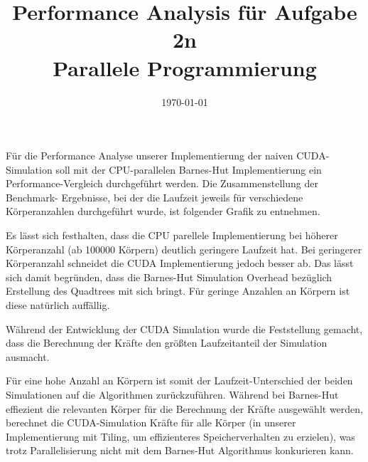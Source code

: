 \documentclass[
  ngerman,
  color=8c,
  submission,
  boxarc,
  fleqn,
]{rubos-tuda-template}
\date{\today}
\begin{document}
\title[Parallele Programmierung]{Performance Analysis für Aufgabe 2n\\ Parallele Programmierung}
\maketitle{}

Für die Performance Analyse unserer Implementierung der naiven CUDA-Simulation soll mit der CPU-parallelen
Barnes-Hut Implementierung ein Performance-Vergleich durchgeführt werden. Die Zusammenstellung der Benchmark-
Ergebnisse, bei der die Laufzeit jeweils für verschiedene Körperanzahlen durchgeführt wurde, ist folgender
Grafik zu entnehmen.


Es lässt sich festhalten, dass die CPU parellele Implementierung bei höherer Körperanzahl (ab 100000 Körpern) deutlich geringere
Laufzeit hat. Bei geringerer Körperanzahl schneidet die CUDA Implementierung jedoch besser ab. Das lässt sich damit begründen, dass
die Barnes-Hut Simulation Overhead bezüglich Erstellung des Quadtrees mit sich bringt. Für geringe Anzahlen an Körpern ist diese
natürlich auffällig.

Während der Entwicklung der CUDA Simulation wurde die Feststellung gemacht, dass die Berechnung der Kräfte den größten Laufzeitanteil der Simulation ausmacht.

Für eine hohe Anzahl an Körpern ist somit der Laufzeit-Unterschied der beiden Simulationen auf die Algorithmen zurückzuführen. Während bei
Barnes-Hut effiezient die relevanten Körper für die Berechnung der Kräfte ausgewählt werden, berechnet die CUDA-Simulation Kräfte für alle
Körper (in unserer Implementierung mit Tiling, um effizienteres Speicherverhalten zu erzielen), was trotz Parallelisierung nicht mit dem
Barnes-Hut Algorithmus konkurieren kann.
\end{document}
